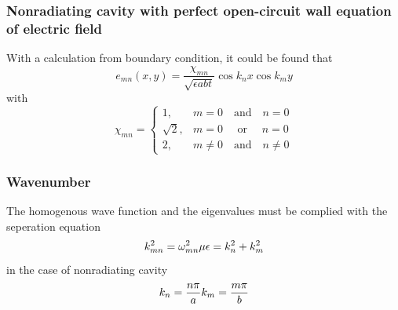 \documentclass[11pt,a4paper]{article}
\begin{document}
      \subsubsection{Nonradiating cavity with perfect open-circuit wall equation of electric field}
        \indent With a calculation from boundary condition, it could be found that
          \begin{equation}
            \label{OpenE}
            e_{mn}(x,y) = \frac{\chi_{mn}}{\sqrt{\epsilon abt}}\cos{k_nx}\cos{k_my}
          \end{equation}
        \indent with
          \begin{equation}
            \chi_{mn}=
            \begin{cases}
              1       , & m = 0\quad     \text{and}\quad  n = 0 \\
              \sqrt{2}, & m = 0\quad     \text{ or }\quad  n = 0 \\
              2       , & m \neq 0\quad  \text{and}\quad  n \neq 0
            \end{cases}
          \end{equation}

      \subsubsection{Wavenumber}
        \indent The homogenous wave function and the eigenvalues must be complied with the seperation equation
        \begin{equation}
          \label{kmn}
          k_{mn}^2 = \omega_{mn}^2\mu\epsilon = k_n^2 + k_m^2\\
        \end{equation}
        \indent in the case of nonradiating cavity
        \begin{equation}
          k_{n} = \frac{n\pi}{a}\\
          k_{m} = \frac{m\pi}{b}
        \end{equation}
\end{document}
